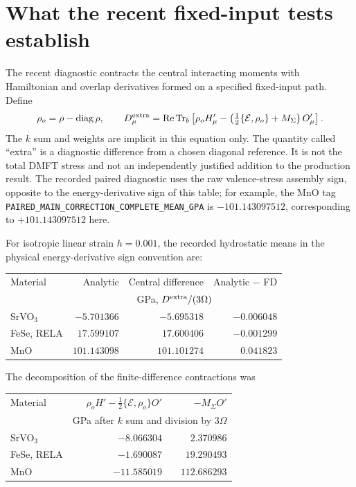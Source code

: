 \documentclass[11pt]{article}
\newcommand{\Tr}{\operatorname{Tr}}
\newcommand{\Rea}{\operatorname{Re}}
\newcommand{\diag}{\operatorname{diag}}
\newcommand{\Es}{\mathcal E}
\newcommand{\pathf}[1]{\nolinkurl{#1}}
\newcommand{\newpart}[1]{\par\Needspace{12\baselineskip}\section{#1}}
\begin{document}
\newpart{What the recent fixed-input tests establish}
\label{sec:tests}
The recent diagnostic contracts the central interacting moments with
Hamiltonian and overlap derivatives formed on a specified fixed-input
path. Define
\begin{equation}
 \rho_o=\rho-\diag\rho,\qquad
 D_\mu^{\rm extra}=\Rea\Tr_b\left[
 \rho_o H'_\mu-
 \left(\tfrac12\{\Es,\rho_o\}+M_\Sigma\right)O'_\mu\right].
 \label{eq:extra}
\end{equation}
The $k$ sum and weights are implicit in this equation only.
The quantity called ``extra'' is a diagnostic difference from a chosen
diagonal reference. It is not the total DMFT stress and not an
independently justified addition to the production result.
The recorded paired diagnostic uses the raw valence-stress assembly
sign, opposite to the energy-derivative sign of this table; for example,
the MnO tag \pathf{PAIRED_MAIN_CORRECTION_COMPLETE_MEAN_GPA} is
$-101.143097512$, corresponding to $+101.143097512$ here.

For isotropic linear strain $h=0.001$, the recorded hydrostatic means
in the physical energy-derivative sign convention are:
\begin{center}
\begin{tabular}{lrrr}
\toprule
Material & Analytic & Central difference & Analytic $-$ FD\\
 & \multicolumn{3}{c}{GPa, $D^{\rm extra}/(3\Omega)$}\\
\midrule
SrVO$_3$ & $-5.701366$ & $-5.695318$ & $-0.006048$\\
FeSe, RELA & $17.599107$ & $17.600406$ & $-0.001299$\\
MnO & $101.143098$ & $101.101274$ & $0.041823$\\
\bottomrule
\end{tabular}
\end{center}
The decomposition of the finite-difference contractions was
\begin{center}
\begin{tabular}{lrr}
\toprule
Material & $\rho_o H'-\tfrac12\{\Es,\rho_o\}O'$ & $-M_\Sigma O'$\\
 & \multicolumn{2}{c}{GPa after $k$ sum and division by $3\Omega$}\\
\midrule
SrVO$_3$ & $-8.066304$ & $2.370986$\\
FeSe, RELA & $-1.690087$ & $19.290493$\\
MnO & $-11.585019$ & $112.686293$\\
\bottomrule
\end{tabular}
\end{center}
\end{document}
